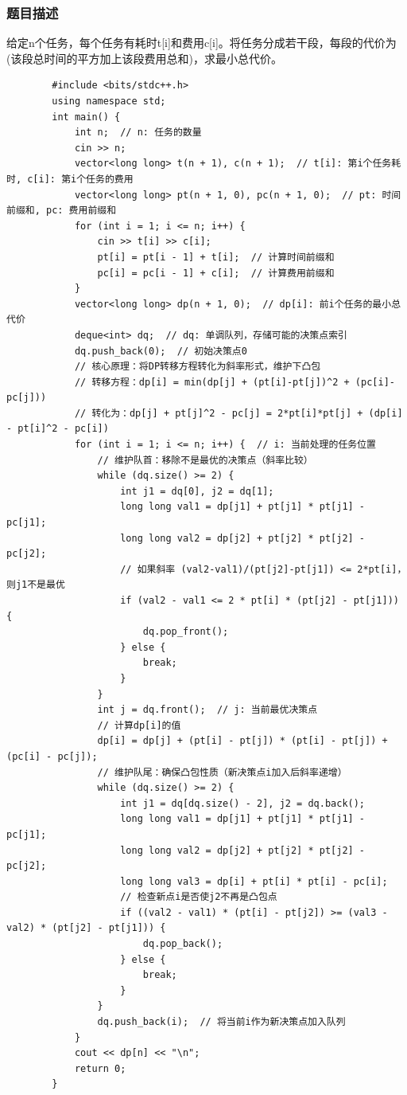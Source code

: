 \documentclass[12pt,a4paper]{ctexart}
\begin{document}
	\subsubsection*{题目描述}
	给定n个任务，每个任务有耗时t[i]和费用c[i]。将任务分成若干段，每段的代价为(该段总时间的平方加上该段费用总和)，求最小总代价。
	\begin{lstlisting}
		#include <bits/stdc++.h>
		using namespace std;
		int main() {
			int n;  // n: 任务的数量
			cin >> n;
			vector<long long> t(n + 1), c(n + 1);  // t[i]: 第i个任务耗时, c[i]: 第i个任务的费用
			vector<long long> pt(n + 1, 0), pc(n + 1, 0);  // pt: 时间前缀和, pc: 费用前缀和
			for (int i = 1; i <= n; i++) {
				cin >> t[i] >> c[i];
				pt[i] = pt[i - 1] + t[i];  // 计算时间前缀和
				pc[i] = pc[i - 1] + c[i];  // 计算费用前缀和
			}
			vector<long long> dp(n + 1, 0);  // dp[i]: 前i个任务的最小总代价
			deque<int> dq;  // dq: 单调队列，存储可能的决策点索引
			dq.push_back(0);  // 初始决策点0
			// 核心原理：将DP转移方程转化为斜率形式，维护下凸包
			// 转移方程：dp[i] = min(dp[j] + (pt[i]-pt[j])^2 + (pc[i]-pc[j]))
			// 转化为：dp[j] + pt[j]^2 - pc[j] = 2*pt[i]*pt[j] + (dp[i] - pt[i]^2 - pc[i])
			for (int i = 1; i <= n; i++) {  // i: 当前处理的任务位置
				// 维护队首：移除不是最优的决策点（斜率比较）
				while (dq.size() >= 2) {
					int j1 = dq[0], j2 = dq[1];
					long long val1 = dp[j1] + pt[j1] * pt[j1] - pc[j1];
					long long val2 = dp[j2] + pt[j2] * pt[j2] - pc[j2];
					// 如果斜率 (val2-val1)/(pt[j2]-pt[j1]) <= 2*pt[i]，则j1不是最优
					if (val2 - val1 <= 2 * pt[i] * (pt[j2] - pt[j1])) {
						dq.pop_front();
					} else {
						break;
					}
				}
				int j = dq.front();  // j: 当前最优决策点
				// 计算dp[i]的值
				dp[i] = dp[j] + (pt[i] - pt[j]) * (pt[i] - pt[j]) + (pc[i] - pc[j]);
				// 维护队尾：确保凸包性质（新决策点i加入后斜率递增）
				while (dq.size() >= 2) {
					int j1 = dq[dq.size() - 2], j2 = dq.back();
					long long val1 = dp[j1] + pt[j1] * pt[j1] - pc[j1];
					long long val2 = dp[j2] + pt[j2] * pt[j2] - pc[j2];
					long long val3 = dp[i] + pt[i] * pt[i] - pc[i];
					// 检查新点i是否使j2不再是凸包点
					if ((val2 - val1) * (pt[i] - pt[j2]) >= (val3 - val2) * (pt[j2] - pt[j1])) {
						dq.pop_back();
					} else {
						break;
					}
				}
				dq.push_back(i);  // 将当前i作为新决策点加入队列
			}
			cout << dp[n] << "\n";
			return 0;
		}
	\end{lstlisting}
\end{document}
